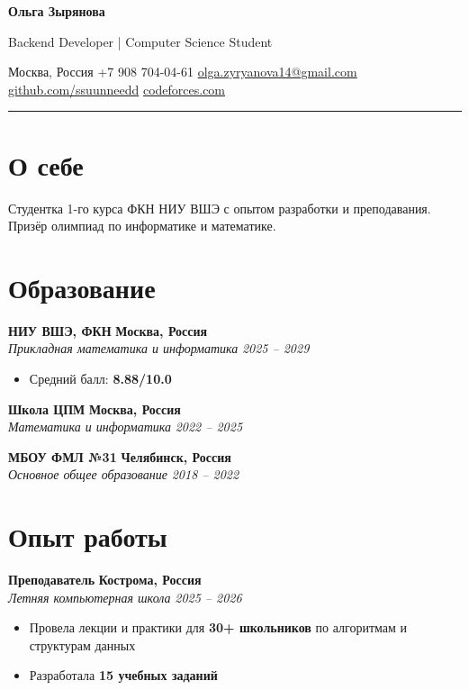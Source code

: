 \documentclass[11pt,a4paper]{article}
\newcommand{\cvevent}[4]{%
  \vspace{3pt}
  \noindent
  {\bfseries\large #1} \hfill {\bfseries #4}\\
  {\color{lighttext}\textit{#2}} \hfill {\color{lighttext}\textit{#3}}
  \vspace{1pt}
}
\begin{document}
\begin{center}
  {\Huge\bfseries\color{darktext} Ольга Зырянова}
  \vspace{2pt}
  
  {\large\color{lighttext} Backend Developer | Computer Science Student}
  \vspace{6pt}
  
  \small
  Москва, Россия \quad
  +7 908 704-04-61 \quad
  \href{mailto:olga.zyryanova14@gmail.com}{olga.zyryanova14@gmail.com} \\
  \href{https://github.com/ssuunneedd}{github.com/ssuunneedd} \quad
  \href{https://codeforces.com/profile/olyazyryanova}{codeforces.com}
\end{center}

\hrule
\vspace{4pt}

\section*{О себе}
Студентка 1-го курса ФКН НИУ ВШЭ с опытом разработки и преподавания. 
Призёр олимпиад по информатике и математике.

\section{Образование}

\cvevent{НИУ ВШЭ, ФКН}{Прикладная математика и информатика}{2025 -- 2029}{Москва, Россия}
\begin{itemize}
  \item Средний балл: \textbf{8.88/10.0}
\end{itemize}

\cvevent{Школа ЦПМ}{Математика и информатика}{2022 -- 2025}{Москва, Россия}

\cvevent{МБОУ ФМЛ №31}{Основное общее образование}{2018 -- 2022}{Челябинск, Россия}

\section{Опыт работы}

\cvevent{Преподаватель}{Летняя компьютерная школа}{2025 -- 2026}{Кострома, Россия}
\begin{itemize}
  \item Провела лекции и практики для \textbf{30+ школьников} по алгоритмам и структурам данных
  \item Разработала \textbf{15 учебных заданий}
\end{itemize}
\end{document}
